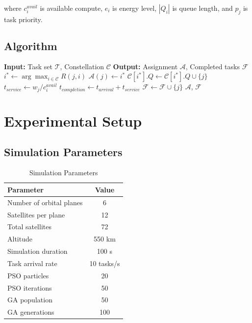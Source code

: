 \documentclass[sigconf]{acmart}
\begin{document}
where $c_i^{avail}$ is available compute, $e_i$ is energy level, $|Q_i|$ is queue length, and $p_j$ is task priority.

\subsection{Algorithm}

\begin{algorithm}
\caption{XING Cognitive Edge Orchestration}
\begin{algorithmic}[1]
\State \textbf{Input:} Task set $\mathcal{T}$, Constellation $\mathcal{C}$
\State \textbf{Output:} Assignment $\mathcal{A}$, Completed tasks $\mathcal{F}$
  \State $i^* \leftarrow \arg\max_{i \in \mathcal{C}} R(j, i)$
  \State $\mathcal{A}(j) \leftarrow i^*$
  \State $\mathcal{C}[i^*].Q \leftarrow \mathcal{C}[i^*].Q \cup \{j\}$
\EndFor
{}
    \State $t_{service} \leftarrow w_j / c_i^{avail}$
    \State $t_{completion} \leftarrow t_{arrival} + t_{service}$
    \State $\mathcal{F} \leftarrow \mathcal{F} \cup \{j\}$
  \EndFor
\EndFor
\State \Return $\mathcal{A}$, $\mathcal{F}$
\end{algorithmic}
\end{algorithm}

\section{Experimental Setup}

\subsection{Simulation Parameters}

\begin{table}[h]
\centering
\caption{Simulation Parameters}
\begin{tabular}{lc}
\toprule
Parameter & Value \\
\midrule
Number of orbital planes & 6 \\
Satellites per plane & 12 \\
Total satellites & 72 \\
Altitude & 550 km \\
Simulation duration & 100 s \\
Task arrival rate & 10 tasks/s \\
PSO particles & 20 \\
PSO iterations & 50 \\
GA population & 50 \\
GA generations & 100 \\
\bottomrule
\end{tabular}
\end{table}
\end{document}
